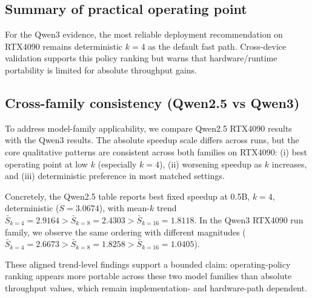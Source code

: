 \subsection{Summary of practical operating point}

For the Qwen3 evidence, the most reliable deployment recommendation on
RTX4090 remains deterministic $k{=}4$ as the default fast path.
Cross-device validation supports this policy ranking but warns that
hardware/runtime portability is limited for absolute throughput gains.

\subsection{Cross-family consistency (Qwen2.5 vs Qwen3)}

To address model-family applicability, we compare Qwen2.5 RTX4090
results with the Qwen3 results.
The absolute speedup scale differs across runs, but the core qualitative
patterns are consistent across both families on RTX4090:
(i) best operating point at low $k$ (especially $k{=}4$),
(ii) worsening speedup as $k$ increases, and
(iii) deterministic preference in most matched settings.

Concretely, the Qwen2.5 table reports best fixed speedup at
0.5B, $k{=}4$, deterministic ($S{=}3.0674$), with mean-$k$ trend
$\bar{S}_{k=4}=2.9164 > \bar{S}_{k=8}=2.4303 > \bar{S}_{k=16}=1.8118$.
In the Qwen3 RTX4090 run family, we observe the same ordering with
different magnitudes ($\bar{S}_{k=4}=2.6673 > \bar{S}_{k=8}=1.8258 >
\bar{S}_{k=16}=1.0405$).

These aligned trend-level findings support a bounded claim:
operating-policy ranking appears more portable across these two model
families than absolute throughput values, which remain implementation- and
hardware-path dependent.
